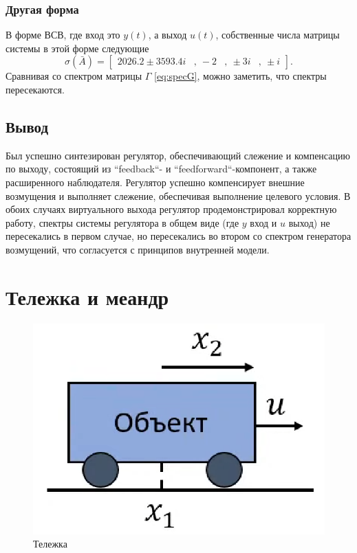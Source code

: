 \subsubsection{Другая форма}

В форме ВСВ, где вход это $y(t)$, а выход $u(t)$,
собственные числа матрицы системы в этой форме следующие
\begin{equation*}
    \sigma(\bar A)=\begin{bmatrix}
        2026.2 \pm 3593.4i &,\ 
        -2&,\ 
        \pm 3i&,\ 
        \pm i
    \end{bmatrix}.
\end{equation*}
Сравнивая со спектром матрицы $\Gamma$ \eqref{eq:specG}, можно заметить, что
спектры пересекаются.



\subsection{Вывод}

Был успешно синтезирован регулятор, обеспечивающий слежение и компенсацию 
по выходу, состоящий из ``feedback``- и ``feedforward``-компонент, 
а также расширенного наблюдателя. Регулятор успешно компенсирует внешние возмущения
и выполняет слежение, обеспечивая выполнение целевого условия. В обоих случаях виртуального 
выхода регулятор продемонстрировал корректную работу, спектры системы
регулятора в общем виде (где $y$ вход и $u$ выход) не пересекались в
первом случае, но пересекались во втором со
спектром генератора возмущений, что согласуется с принципов внутренней модели.




\section{Тележка и меандр}

\begin{figure}[H]
    \centering
    \includegraphics[width=0.4\linewidth]{figs/тележка.png}
    \caption{Тележка}
    \label{fig:cart}
\end{figure}


